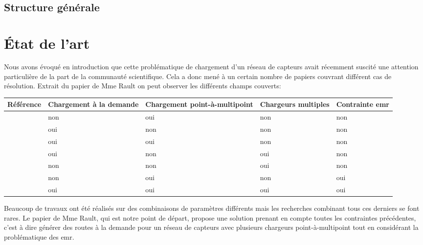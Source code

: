 \documentclass[noposter]{polytech}
\begin{document}
			
	\section{Structure générale} %
	

\chapter{État de l'art}
	Nous avons évoqué en introduction que cette problématique de chargement d'un réseau de capteurs avait récemment suscité une attention particulière de la part de la communauté scientifique.
	Cela a donc mené à un certain nombre de papiers couvrant différent cas de résolution.
	Extrait du papier de Mme Rault \cite{Rault:chargers} on peut observer les différents champs couverts:
	
	\begin{center}
		\centering
		\begin{tabularx}{\textwidth}{|c||X|X|X|X|}
			\hline
			Référence & Chargement à la demande & Chargement point-à-multipoint & Chargeurs multiples & Contrainte \gls{emr}\\\hline\hline
			\cite{6275766} \cite{LIN2016381} & non & oui & non & non\\\hline
			\cite{6911792} \cite{1999253} & oui & non & non & non\\\hline
			\cite{KHELLADI201744} & oui & oui & non & non\\\hline
			\cite{LIN201688} \cite{Madhja2015} \cite{wang2013multi} \cite{Jiang2014} & oui & non & oui & non\\\hline
			\cite{7889006} & non & non & oui & non\\\hline
			\cite{NIKOLETSEAS20171} \cite{8051273} \cite{6888920} \cite{7524385} & non & oui & non & oui\\\hline\hline
			\rowcolor{polytechlightblue}
			\cite{Rault:chargers} & oui & oui & oui & oui\\\hline
		\end{tabularx}	
	\end{center}
	
	Beaucoup de travaux ont été réalisés sur des combinaisons de paramètres différents mais les recherches combinant tous ces derniers se font rares.
	Le papier de Mme Rault, qui est notre point de départ, propose une solution prenant en compte toutes les contraintes précédentes, c'est à dire générer des routes à la demande pour un réseau de capteurs avec plusieurs chargeurs point-à-multipoint tout en considérant la problématique des \gls{emr}.
	
\end{document}
